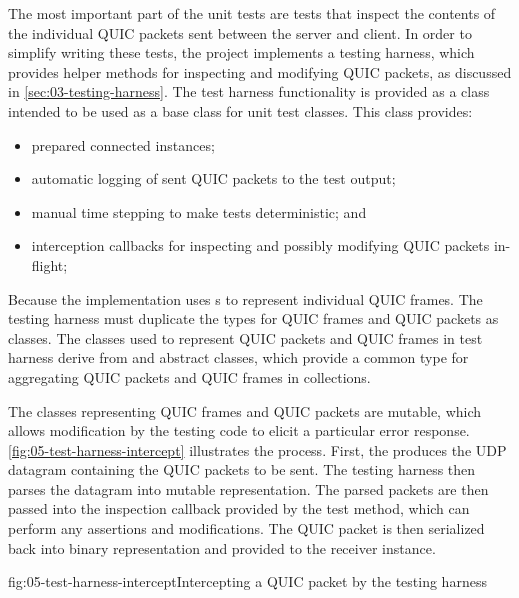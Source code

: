 The most important part of the unit tests are tests that inspect the contents of the individual QUIC
packets sent between the server and client. In order to simplify writing these tests, the
 project implements a testing harness, which provides helper
methods for inspecting and modifying QUIC packets, as discussed in \autoref{sec:03-testing-harness}.
The test harness functionality is provided as a \ManualTransmissionQuicTestBase{} class intended to
be used as a base class for unit test classes. This class provides:

\begin{itemize}

  \item prepared connected \ManagedQuicConnection{} instances;

  \item automatic logging of sent QUIC packets to the test output;

  \item manual time stepping to make tests deterministic; and

  \item interception callbacks for inspecting and possibly modifying QUIC packets in-flight;

\end{itemize}

Because the \ManagedQuicConnection{} implementation uses s to represent
individual QUIC frames. The testing harness must duplicate the types for QUIC frames and QUIC
packets as classes. The classes used to represent QUIC packets and QUIC frames in test harness
derive from  and  abstract classes, which provide a common type
for aggregating QUIC packets and QUIC frames in collections.

The classes representing QUIC frames and QUIC packets are mutable, which allows modification by the
testing code to elicit a particular error response. \autoref{fig:05-test-harness-intercept}
illustrates the process. First, the \ManagedQuicConnection{} produces the UDP datagram containing
the QUIC packets to be sent. The testing harness then parses the datagram into mutable
representation. The parsed packets are then passed into the inspection callback provided by the test
method, which can perform any assertions and modifications. The QUIC packet is then serialized back
into binary representation and provided to the receiver \ManagedQuicConnection{} instance.

\begin{myFigure}{fig:05-test-harness-intercept}{Intercepting a QUIC packet by the testing harness}

  \resizebox{\textwidth}{!}{}

\end{myFigure}


